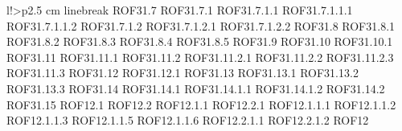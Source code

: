 \begin{tabella}{l!{\VRule}>{\centering\arraybackslash}p{2.5 cm}}
linebreak ROF31.7 \linebreak ROF31.7.1 \linebreak ROF31.7.1.1 \linebreak ROF31.7.1.1.1 \linebreak ROF31.7.1.1.2 \linebreak ROF31.7.1.2 \linebreak ROF31.7.1.2.1 \linebreak ROF31.7.1.2.2 \linebreak ROF31.8 \linebreak ROF31.8.1 \linebreak ROF31.8.2 \linebreak ROF31.8.3 \linebreak ROF31.8.4 \linebreak ROF31.8.5 \linebreak ROF31.9 \linebreak ROF31.10 \linebreak ROF31.10.1 \linebreak ROF31.11 \linebreak ROF31.11.1 \linebreak ROF31.11.2 \linebreak ROF31.11.2.1 \linebreak ROF31.11.2.2 \linebreak ROF31.11.2.3 \linebreak ROF31.11.3 \linebreak ROF31.12 \linebreak ROF31.12.1 \linebreak ROF31.13 \linebreak ROF31.13.1 \linebreak ROF31.13.2 \linebreak ROF31.13.3 \linebreak ROF31.14 \linebreak ROF31.14.1 \linebreak ROF31.14.1.1 \linebreak ROF31.14.1.2 \linebreak ROF31.14.2 \linebreak ROF31.15 \linebreak ROF12.1 \linebreak ROF12.2 \linebreak ROF12.1.1 \linebreak ROF12.2.1 \linebreak ROF12.1.1.1 \linebreak ROF12.1.1.2 \linebreak ROF12.1.1.3 \linebreak ROF12.1.1.5 \linebreak ROF12.1.1.6 \linebreak ROF12.2.1.1 \linebreak ROF12.2.1.2 \linebreak ROF12 \\

\end{tabella}
